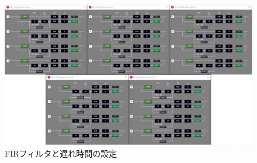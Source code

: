 \documentclass[11pt,a4j]{jreport}
\begin{document}
\newpage
\begin{figure}[H]
  \centering
  \includegraphics[width=.8\linewidth]{images/experimentField/afcParameters/base03FIR.jpg}
  \caption{FIRフィルタと遅れ時間の設定}
  \label{fig:FIRフィルタの設定}
\end{figure}
\end{document}
